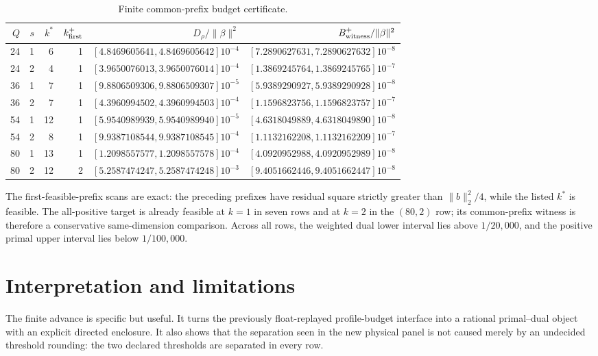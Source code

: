 \documentclass[10pt,a4paper]{article}
\begin{document}
\begin{table}[t]
\centering\small
\caption{Finite common-prefix budget certificate.}
\label{tab:main}
\begin{tabular}{rrrrrr}
\toprule
$Q$ & $s$ & $k^*$ & $k^+_{\rm first}$ & $D_\rho/\|\beta\|^2$
 & $B^+_{\rm witness}/\|\beta\|^2$\\
\midrule
24 & 1 & 6  & 1 & $[4.8469605641,4.8469605642]10^{-4}$
                 & $[7.2890627631,7.2890627632]10^{-8}$\\
24 & 2 & 4  & 1 & $[3.9650076013,3.9650076014]10^{-4}$
                 & $[1.3869245764,1.3869245765]10^{-7}$\\
36 & 1 & 7  & 1 & $[9.8806509306,9.8806509307]10^{-5}$
                 & $[5.9389290927,5.9389290928]10^{-8}$\\
36 & 2 & 7  & 1 & $[4.3960994502,4.3960994503]10^{-4}$
                 & $[1.1596823756,1.1596823757]10^{-7}$\\
54 & 1 & 12 & 1 & $[5.9540989939,5.9540989940]10^{-5}$
                 & $[4.6318049889,4.6318049890]10^{-8}$\\
54 & 2 & 8  & 1 & $[9.9387108544,9.9387108545]10^{-4}$
                 & $[1.1132162208,1.1132162209]10^{-7}$\\
80 & 1 & 13 & 1 & $[1.2098557577,1.2098557578]10^{-4}$
                 & $[4.0920952988,4.0920952989]10^{-8}$\\
80 & 2 & 12 & 2 & $[5.2587474247,5.2587474248]10^{-3}$
                 & $[9.4051662446,9.4051662447]10^{-8}$\\
\bottomrule
\end{tabular}
\end{table}

The first-feasible-prefix scans are exact: the preceding prefixes have
residual square strictly greater than $\|b\|_2^2/4$, while the listed $k^*$
is feasible.  The all-positive target is already feasible at $k=1$ in seven
rows and at $k=2$ in the $(80,2)$ row; its common-prefix witness is therefore
a conservative same-dimension comparison.  Across all rows, the weighted
dual lower interval lies above $1/20{,}000$, and the positive primal upper
interval lies below $1/100{,}000$.

\section{Interpretation and limitations}

The finite advance is specific but useful.  It turns the previously
float-replayed profile-budget interface into a rational primal--dual object
with an explicit directed enclosure.  It also shows that the separation seen
in the new physical panel is not caused merely by an undecided threshold
rounding: the two declared thresholds are separated in every row.
\end{document}
